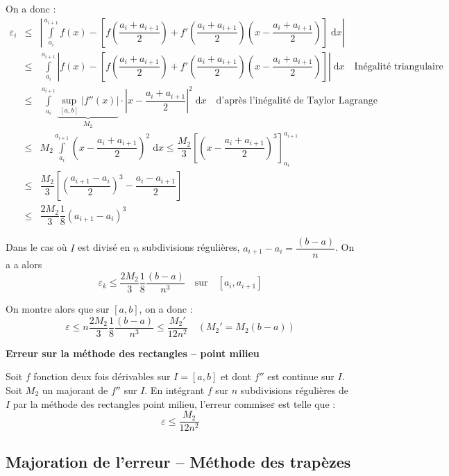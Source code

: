 \documentclass[10pt,fleqn]{article} %
\begin{document}
  On a donc :  
\begin{eqnarray*}
\varepsilon_i & \leq &\left|
\int\limits_{a_i}^{a_{i+1}} f(x) - \left[
f\left(\dfrac{a_i+a_{i+1}}{2} \right)
+f'\left(\dfrac{a_i+a_{i+1}}{2} \right)\left(x - \dfrac{a_i+a_{i+1}}{2}\right)
\right] \; \mathrm{d}x\right| \\
& \leq & \int\limits_{a_i}^{a_{i+1}} \left|f(x) - \left[
f\left(\dfrac{a_i+a_{i+1}}{2} \right)
+f'\left(\dfrac{a_i+a_{i+1}}{2} \right)\left(x - \dfrac{a_i+a_{i+1}}{2}\right)
\right] \right|\; \mathrm{d}x \quad \text{Inégalité triangulaire}\\
& \leq & \int\limits_{a_i}^{a_{i+1}} \underbrace{\underset{[a,b]}{\sup} \left| f''(x)\right|}_{M_2} \cdot \left| x- \dfrac{a_i+a_{i+1}}{2}\right|^2  \; \mathrm{d}x \quad \text{d'après l'inégalité de Taylor Lagrange}\\
& \leq & M_2 \int\limits_{a_i}^{a_{i+1}} \left( x- \dfrac{a_i+a_{i+1}}{2}\right)^2  \; \mathrm{d}x \leq \dfrac{M_2}{3} \left[ \left( x- \dfrac{a_i+a_{i+1}}{2}\right)^3\right]_{a_i}^{a_{i+1}} \\
& \leq & \dfrac{M_2}{3} \left[ \left( \dfrac{a_{i+1}-a_{i}}{2} \right)^3- \dfrac{a_i-a_{i+1}}{2}\right]\\
& \leq & \dfrac{2M_2}{3}\dfrac{1}{8}\left( {a_{i+1}-a_{i}}\right)^3
\end{eqnarray*}


Dans le cas où $I$ est divisé en $n$ subdivisions régulières, $a_{i+1}-a_i = \dfrac{(b-a)}{n}$. On a a alors 
$$
\varepsilon_k \leq \dfrac{2M_2}{3}\dfrac{1}{8}\dfrac{(b-a)}{n^3} \quad \text{sur}\quad [a_i,a_{i+1}]
$$

On montre alors que sur $[a,b]$, on a donc :
$$
\varepsilon \leq n \dfrac{2M_2}{3}\dfrac{1}{8}\dfrac{(b-a)}{n^3} \leq \dfrac{M_2'}{12 n^2}
\quad
(M_2 ' = M_2 (b-a))
$$

\begin{resultat}
\textbf{Erreur sur la méthode des rectangles -- point milieu}

Soit $f$ fonction deux fois dérivables sur $I=[a,b]$ et dont $f''$ est continue sur $I$. Soit $M_2$ un majorant de $f''$ sur $I$. En intégrant $f$ sur $n$ subdivisions régulières de $I$ par la méthode des rectangles point milieu, l'erreur commise$\varepsilon$ est telle que : 
$$ \varepsilon \leq \dfrac{M_2}{12n^2}$$ 

\end{resultat}

\subsection{Majoration de l'erreur -- Méthode des trapèzes}
\end{document}
